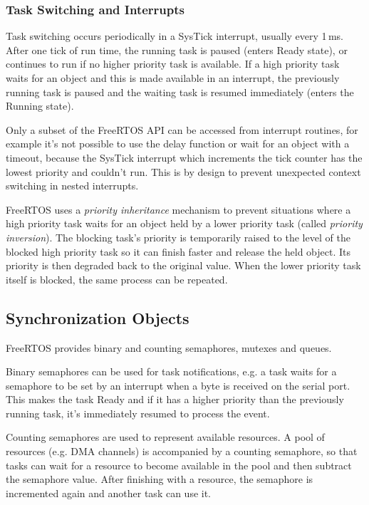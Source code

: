 \subsubsection{Task Switching and Interrupts}

Task switching occurs periodically in a SysTick interrupt, usually every 1\,ms. After one tick of run time, the running task is paused (enters Ready state), or continues to run if no higher priority task is available. If a high priority task waits for an object and this is made available in an interrupt, the previously running task is paused and the waiting task is resumed immediately (enters the Running state). 

Only a subset of the FreeRTOS API can be accessed from interrupt routines, for example it's not possible to use the delay function or wait for an object with a timeout, because the SysTick interrupt which increments the tick counter has the lowest priority and couldn't run. This is by design to prevent unexpected context switching in nested interrupts.

FreeRTOS uses a \textit{priority inheritance} mechanism to prevent situations where a high priority task waits for an object held by a lower priority task (called \textit{priority inversion}). The blocking task's priority is temporarily raised to the level of the blocked high priority task so it can finish faster and release the held object. Its priority is then degraded back to the original value. When the lower priority task itself is blocked, the same process can be repeated.

\subsection{Synchronization Objects}

FreeRTOS provides binary and counting semaphores, mutexes and queues. 

Binary semaphores can be used for task notifications, e.g. a task waits for a semaphore to be set by an interrupt when a byte is received on the serial port. This makes the task Ready and if it has a higher priority than the previously running task, it's immediately resumed to process the event.

Counting semaphores are used to represent available resources. A pool of resources (e.g. DMA channels) is accompanied by a counting semaphore, so that tasks can wait for a resource to become available in the pool and then subtract the semaphore value. After finishing with a resource, the semaphore is incremented again and another task can use it.

